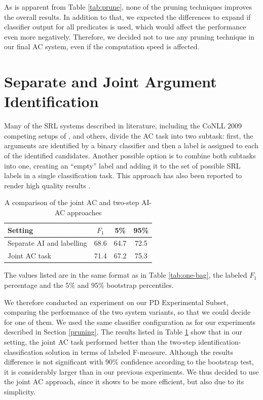 \documentclass[12pt,notitlepage]{report}
\begin{document}
As is apparent from Table \ref{tab:prune}, none of the pruning techniques improves the overall results. In addition to that, we expected the differences to expand if classifier output for all predicates is used, which would affect the performance even more negatively. Therefore, we decided not to use any pruning technique in our final AC system, even if the computation speed is affected.

\section{Separate and Joint Argument Identification}\label{ai-ac}

Many of the SRL systems described in literature, including the CoNLL 2009 competing setups of \citet{chen09}, \citet{bohnet09} and others, divide the AC task into two subtask: first, the arguments are identified by a binary classifier and then a label is assigned to each of the identified candidates. Another possible option is to combine both subtasks into one, creating an ``empty'' label and adding it to the set of possible SRL labels in a single classification task. This approach has also been reported to render high quality results \citep{che09,asahara09}.

\begin{table}[htb]\label{tab:ai-ac}
\caption{A comparison of the joint AC and two-step AI-AC approaches}\footnotesize
\begin{center}
\begin{tabular}{|l|c|c|c|}\hline
\bf Setting & $F_1$ & \bf 5\% & \bf 95\% \\\hline
Separate AI and labelling & 68.6 & 64.7 & 72.5 \\
Joint AC task & 71.4 & 67.2 & 75.3 \\\hline
\end{tabular}
\end{center}
The values listed are in the same format as in Table \ref{tab:one-bag}, the labeled $F_1$ percentage and the 5\% and 95\% bootstrap percentiles.
\end{table}

We therefore conducted an experiment on our PD Experimental Subset, comparing the performance of the two system variants, so that we could decide for one of them. We used the same classifier configuration as for our experiments described in Section \ref{pruning}. The results listed in Table \ref{tab:ai-ac} show that in our setting, the joint AC task performed better than the two-step identification-classification solution in terms of labeled F-measure. Although the results difference is not significant with $90\%$ confidence according to the bootstrap test, it is considerably larger than in our previous experiments. We thus decided to use the joint AC approach, since it shows to be more efficient, but also due to its simplicity.
\end{document}
